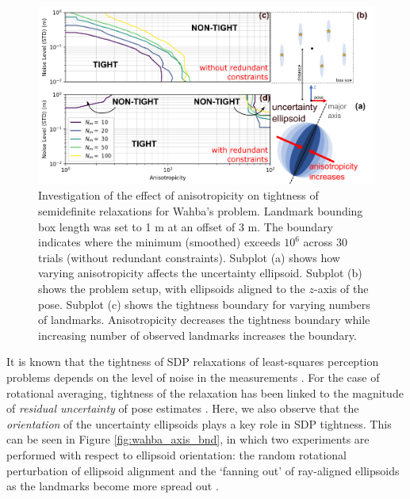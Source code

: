 \documentclass[lettersize,journal]{IEEEtran}
\newcommand{\rev}[1]{\color{red}{#1}\color{black}}
\begin{document}
\begin{figure}[!t]
	\centering
	\includegraphics[width=\columnwidth]{figs/elliposoid_align_fig.png}
	\caption{Investigation of the effect of anisotropicity on tightness of semidefinite relaxations for Wahba's problem. Landmark bounding box length was set to 1 m at an offset of 3 m. The boundary indicates where the minimum (smoothed) \rev{ER } exceeds $ 10^{6}$ across 30 trials (without redundant constraints). Subplot (a) shows how varying anisotropicity affects the uncertainty ellipsoid. Subplot (b) shows the problem setup, with ellipsoids aligned to the $z$-axis of the pose. Subplot (c) shows the tightness boundary for varying numbers of landmarks. Anisotropicity decreases the tightness boundary while increasing number of observed landmarks increases the boundary.}
	\label{fig:ellipsoid_align}
\end{figure}

It is known that the tightness of SDP relaxations of least-squares perception problems depends on the level of noise in the measurements \cite{brialesConvexGlobal3D2017, rosenSESyncCertifiablyCorrect2019, cifuentesLocalStabilitySemidefinite2022}. For the case of rotational averaging, tightness of the relaxation has been linked to the magnitude of \textit{residual uncertainty} of pose estimates \cite{erikssonRotationAveragingStrong2018}. Here, we also observe that the \emph{orientation} of the uncertainty ellipsoids plays a key role in SDP tightness. This can be seen in Figure \ref{fig:wahba_axis_bnd}, in which two experiments are performed with respect to ellipsoid orientation: the random rotational perturbation of ellipsoid alignment \rev{(Figure \ref{fig:wahba_axis_bnd}(a))} and the `fanning out' of ray-aligned ellipsoids as the landmarks become more spread out \rev{(Figure \ref{fig:wahba_axis_bnd}(b))}.
\end{document}
